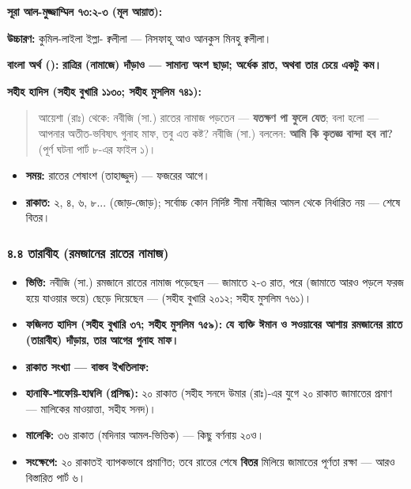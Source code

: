 \textbf{সূরা আল-মুজ্জাম্মিল ৭৩:২-৩ (মূল আয়াত):}

\begin{center}\end{center}

\textbf{উচ্চারণ:} কুমিল-লাইলা ইল্লা- ক্বলীলা — নিসফাহূ আও আনকুস মিনহু ক্বলীলা।

\textbf{বাংলা অর্থ ():}
\textbf{রাত্রির (নামাজে) দাঁড়াও — সামান্য অংশ ছাড়া; অর্ধেক রাত, অথবা তার চেয়ে একটু কম।}

\textbf{সহীহ হাদিস (সহীহ বুখারি ১১৩০; সহীহ মুসলিম ৭৪১):}

\begin{quote}
আয়েশা (রাঃ) থেকে: নবীজি (সা.) রাতের নামাজ পড়তেন — \textbf{যতক্ষণ পা ফুলে যেত}; বলা হলো — আপনার অতীত-ভবিষ্যৎ গুনাহ মাফ, তবু এত কষ্ট? নবীজি (সা.) বললেন: \textbf{আমি কি কৃতজ্ঞ বান্দা হব না?} (পূর্ণ ঘটনা পার্ট ৮-এর ফাইল ১)।
\end{quote}

\begin{itemize}
\item \textbf{সময়:} রাতের শেষাংশ (তাহাজ্জুদ) — ফজরের আগে।
\item \textbf{রাকাত:} ২, ৪, ৬, ৮... (জোড়-জোড়); সর্বোচ্চ কোন নির্দিষ্ট সীমা নবীজির আমল থেকে নির্ধারিত নয় — শেষে বিতর।
\end{itemize}
\subsubsection*{৪.৪ তারাবীহ (রমজানের রাতের নামাজ)}

\begin{itemize}
\item \textbf{ভিত্তি:} নবীজি (সা.) রমজানে রাতের নামাজ পড়েছেন — জামাতে ২-৩ রাত, পরে (জামাতে আরও পড়লে ফরজ হয়ে যাওয়ার ভয়ে) ছেড়ে দিয়েছেন — (সহীহ বুখারি ২০১২; সহীহ মুসলিম ৭৬১)।
\item \textbf{ফজিলত হাদিস (সহীহ বুখারি ৩৭; সহীহ মুসলিম ৭৫৯):} \textbf{যে ব্যক্তি ঈমান ও সওয়াবের আশায় রমজানের রাতে (তারাবীহ) দাঁড়ায়, তার আগের গুনাহ মাফ।}
\item \textbf{রাকাত সংখ্যা — বাস্তব ইখতিলাফ:}
\item \textbf{হানাফি-শাফেয়ি-হাম্বলি (প্রসিদ্ধ):} ২০ রাকাত (সহীহ সনদে উমার (রাঃ)-এর যুগে ২০ রাকাত জামাতের প্রমাণ — মালিকের মাওয়াত্তা, সহীহ সনদ)।
\item \textbf{মালেকি:} ৩৬ রাকাত (মদিনার আমল-ভিত্তিক) — কিছু বর্ণনায় ২০ও।
\item \textbf{সংক্ষেপে:} ২০ রাকাতই ব্যাপকভাবে প্রমাণিত; তবে রাতের শেষে \textbf{বিতর} মিলিয়ে জামাতের পূর্ণতা রক্ষা — আরও বিস্তারিত পার্ট ৬।
\end{itemize}
